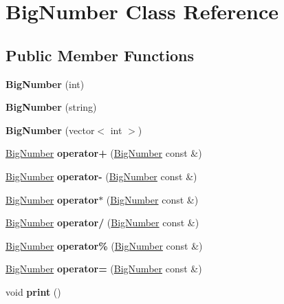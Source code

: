 \hypertarget{class_big_number}{}\section{Big\+Number Class Reference}
\label{class_big_number}
\subsection*{Public Member Functions}
\begin{DoxyCompactItemize}
\item 
\mbox{\label{class_big_number_a0e7a9e3fa79ac17ec85c085590bb138d}} 
{\bfseries Big\+Number} (int)
\item 
\mbox{\label{class_big_number_afb31c2ab0eb824c7307527c9ddbada77}} 
{\bfseries Big\+Number} (string)
\item 
\mbox{\label{class_big_number_a8fc9cfe678468cc42b7d00e30a5b0b91}} 
{\bfseries Big\+Number} (vector$<$ int $>$)
\item 
\mbox{\label{class_big_number_af826da5863fad7f82fc9440acd0c89e1}} 
\mbox{\hyperlink{class_big_number}{Big\+Number}} {\bfseries operator+} (\mbox{\hyperlink{class_big_number}{Big\+Number}} const \&)
\item 
\mbox{\label{class_big_number_af3c756bc59163d148df3362645e2333f}} 
\mbox{\hyperlink{class_big_number}{Big\+Number}} {\bfseries operator-\/} (\mbox{\hyperlink{class_big_number}{Big\+Number}} const \&)
\item 
\mbox{\label{class_big_number_a31ebc110873b140dc3e8cd425fb60965}} 
\mbox{\hyperlink{class_big_number}{Big\+Number}} {\bfseries operator$\ast$} (\mbox{\hyperlink{class_big_number}{Big\+Number}} const \&)
\item 
\mbox{\label{class_big_number_a0ccd9f6341c9aafcde1a9debdd439e24}} 
\mbox{\hyperlink{class_big_number}{Big\+Number}} {\bfseries operator/} (\mbox{\hyperlink{class_big_number}{Big\+Number}} const \&)
\item 
\mbox{\label{class_big_number_a0c7606146bfe0d4d78cfac59e8c4f905}} 
\mbox{\hyperlink{class_big_number}{Big\+Number}} {\bfseries operator\%} (\mbox{\hyperlink{class_big_number}{Big\+Number}} const \&)
\item 
\mbox{\label{class_big_number_afc5ee38138abac221a9b8215a187383f}} 
\mbox{\hyperlink{class_big_number}{Big\+Number}} {\bfseries operator=} (\mbox{\hyperlink{class_big_number}{Big\+Number}} const \&)
\item 
\mbox{\label{class_big_number_a12b0e9ff1459434b916e73468bd41981}} 
void {\bfseries print} ()
\end{DoxyCompactItemize}
